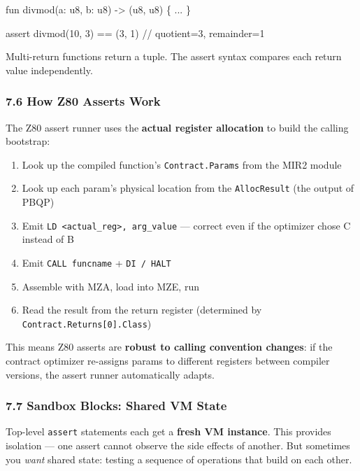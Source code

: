 \documentclass[
  11pt,
]{article}
\newenvironment{Shaded}{}{}
\newcommand{\NormalTok}[1]{#1}
\providecommand{\tightlist}{%
  \setlength{\itemsep}{0pt}\setlength{\parskip}{0pt}}
\begin{document}
\begin{Shaded}
\begin{Highlighting}[]
\NormalTok{fun divmod(a: u8, b: u8) {-}\textgreater{} (u8, u8) \{ ... \}}

\NormalTok{assert divmod(10, 3) == (3, 1)   // quotient=3, remainder=1}
\end{Highlighting}
\end{Shaded}

Multi-return functions return a tuple. The assert syntax compares each
return value independently.

\subsubsection{7.6 How Z80 Asserts Work}\label{how-z80-asserts-work}

The Z80 assert runner uses the \textbf{actual register allocation} to
build the calling bootstrap:

\begin{enumerate}
\def\labelenumi{\arabic{enumi}.}
\tightlist
\item
  Look up the compiled function's \texttt{Contract.Params} from the MIR2
  module
\item
  Look up each param's physical location from the \texttt{AllocResult}
  (the output of PBQP)
\item
  Emit \texttt{LD\ \textless{}actual\_reg\textgreater{},\ arg\_value}
  --- correct even if the optimizer chose C instead of B
\item
  Emit \texttt{CALL\ funcname} + \texttt{DI\ /\ HALT}
\item
  Assemble with MZA, load into MZE, run
\item
  Read the result from the return register (determined by
  \texttt{Contract.Returns{[}0{]}.Class})
\end{enumerate}

This means Z80 asserts are \textbf{robust to calling convention
changes}: if the contract optimizer re-assigns params to different
registers between compiler versions, the assert runner automatically
adapts.

\subsubsection{7.7 Sandbox Blocks: Shared VM
State}\label{sandbox-blocks-shared-vm-state}

Top-level \texttt{assert} statements each get a \textbf{fresh VM
instance}. This provides isolation --- one assert cannot observe the
side effects of another. But sometimes you \emph{want} shared state:
testing a sequence of operations that build on each other.
\end{document}

